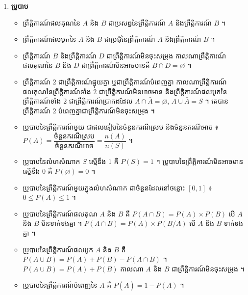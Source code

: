\begin{note}[មេរៀនសង្ខេប]
\begin{enumerate}[1]
  \begin{itemize}
    \item ផលបូកនេះមាន $(n + 1)$ តួ ។
    \item ចំពោះតួបន្តបន្ទាប់គ្នា ស្វ័យគុណរបស់ $a$ ចុះតាមលំដាប់នៅពេលដែលស្វ័យគុណរបស់ $b$ កើនតាមលំដាប់ ។
    \item ក្នុងតួនីមួយៗផលបូកនៃស្វ័យគុណ $a$ និង $b$ ស្មើនឹង $n$ ។
    \item មេគុណរបស់ $a^{n-k}b^k$ គឺ ${}_nC_k$ ។
    \item ករណី $b = 1$ គេបាន $(1 + a)^n = {}_nC_0 + {}_nC_1 a + {}_nC_2 a^2 + \dots + {}_nC_n a^n$ ហើយមេគុណរបស់ $a^k$ គឺ ${}_nC_k$ ។
  \end{itemize}
  \item \textbf{ប្រូបាប}
  \begin{itemize}
    \item ព្រឹត្តិការណ៍ផលគុណនៃ $A$ និង $B$ ជាប្រសព្វនៃព្រឹត្តិការណ៍ $A$ និងព្រឹត្តិការណ៍ $B$ ។
    \item ព្រឹត្តិការណ៍ផលបូកនៃ $A$ និង $B$ ជាប្រជុំនៃព្រឹត្តិការណ៍ $A$ និងព្រឹត្តិការណ៍ $B$ ។
    \item ព្រឹត្តិការណ៍ $B$ និងព្រឹត្តិការណ៍ $D$ ជាព្រឹត្តិការណ៍មិនចុះសម្រុង កាលណាព្រឹត្តិការណ៍ផលគុណនៃ $B$ និង $D$ ជាព្រឹត្តិការណ៍មិនអាចមានគឺ $B \cap D = \varnothing$ ។
    \item ព្រឹត្តិការណ៍ $2$ ជាព្រឹត្តិការណ៍ផ្ទុយគ្នា ឬជាព្រឹត្តិការណ៍បំពេញគ្នា កាលណាព្រឹត្តិការណ៍ផលគុណនៃព្រឹត្តិការណ៍ទាំង $2$ ជាព្រឹត្តិការណ៍មិនអាចមាន និងព្រឹត្តិការណ៍ផលបូកនៃព្រឹត្តិការណ៍ទាំង $2$ ជាព្រឹត្តិការណ៍ប្រាកដដែល $A \cap \bar{A} = \varnothing$, $A \cup \bar{A} = S$ ។ គេបានព្រឹត្តិការណ៍ $2$ បំពេញគ្នាជាព្រឹត្តិការណ៍មិនចុះសម្រុង ។
    \item ប្រូបាបនៃព្រឹត្តិការណ៍មួយ ជាផលធៀបនៃចំនួនករណីស្រប និងចំនួនករណីអាច ៖ $P(A) = \dfrac{\text{ចំនួនករណីស្រប}}{\text{ចំនួនករណីអាច}} = \dfrac{n(A)}{n(S)}$ ។
    \item ប្រូបាបនៃលំហសំណាក $S$ ស្មើនឹង $1$ គឺ $P(S) = 1$ ។ ប្រូបាបនៃព្រឹត្តិការណ៍មិនអាចមានស្មើនឹង $0$ គឺ $P(\varnothing) = 0$ ។
    \item ប្រូបាបនៃព្រឹត្តិការណ៍មួយក្នុងលំហសំណាក ជាចំនួនដែលនៅចន្លោះ $[0, 1]$ ៖ $0 \le P(A) \le 1$ ។
    \item ប្រូបាបនៃព្រឹត្តិការណ៍ផលគុណ $A$ និង $B$ គឺ $P(A \cap B) = P(A)\times P(B)$ បើ $A$ និង $B$ មិនទាក់ទងគ្នា ។ $P(A \cap B) = P(A)\times P(B/A)$ បើ $A$ និង $B$ ទាក់ទងគ្នា ។
    \item ប្រូបាបនៃព្រឹត្តិការណ៍ផលបូក $A$ និង $B$ គឺ $P(A \cup B) = P(A) + P(B) - P(A \cap B)$ ។ $P(A \cup B) = P(A) + P(B)$ កាលណា $A$ និង $B$ ជាព្រឹត្តិការណ៍មិនចុះសម្រុង ។
    \item ប្រូបាបនៃព្រឹត្តិការណ៍បំពេញនៃ $A$ គឺ $P(\bar{A}) = 1 - P(A)$ ។
  \end{itemize}
\end{enumerate}
\end{note}

